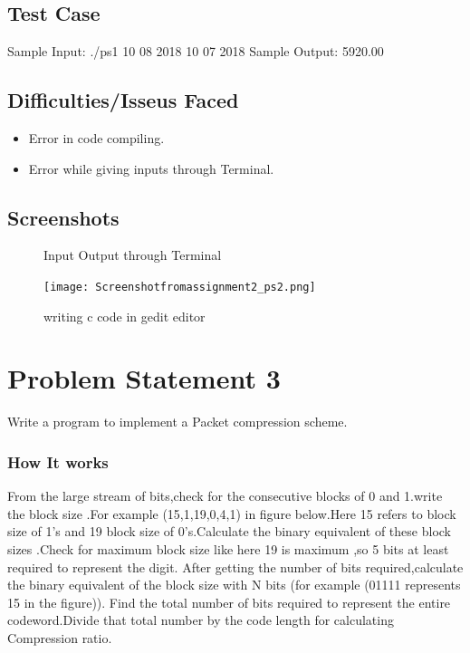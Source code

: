 \documentclass[a4paper,12pt]{article}
\begin{document}
\subsection{Test Case}
Sample Input:  ./ps1 10 08 2018 10 07 2018
Sample Output:  5920.00

\subsection{Difficulties/Isseus Faced}
\begin{itemize}
\item Error in code compiling.
\item Error while giving inputs through Terminal.
\end{itemize}
\subsection{Screenshots}
\begin{figure}

\caption{Input Output through Terminal}
\end{figure}
\begin{figure}
\texttt{[image: Screenshotfromassignment2\_ps2.png]}
\caption{writing c code in gedit editor}
\end{figure}


\section{Problem Statement 3 \cite{reference}} 
Write a program to implement a Packet compression scheme.
\subsubsection*{How It works}
From the large stream of bits,check for the consecutive blocks of 0 and 1.write the block size .For example ({15,1},{19,0},{4,1}) in figure below.Here 15 refers to block size of 1’s and 19 block size of 0’s.Calculate the binary equivalent of these block sizes .Check for maximum block size like here 19 is maximum ,so 5 bits at least required to represent the digit. After getting the number of bits required,calculate the binary equivalent of the block size with N bits (for example (01111 represents 15 in the figure)).
Find the total number of bits required to represent the entire codeword.Divide that total number by the code length for calculating Compression ratio.
\begin{figure}[h]

\end{figure}
\end{document}
